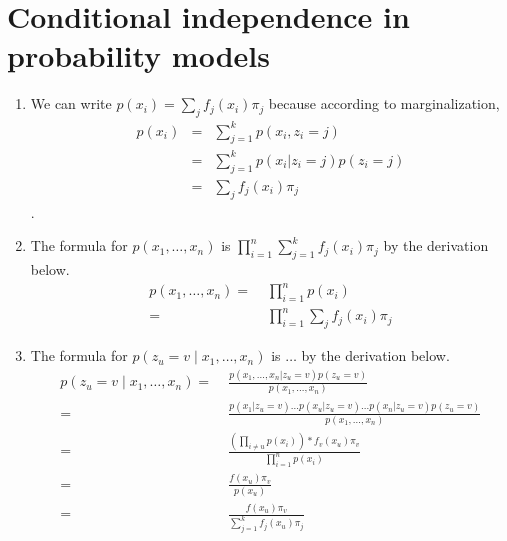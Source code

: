 \section{Conditional independence in probability models}
\begin{enumerate}
\item We can write $p(x_{i})=\sum_{j}f_{j}(x_{i})\pi_{j}$ because according
to marginalization, \begin{eqnarray*}
p(x_{i}) & = & \sum_{j=1}^{k}p(x_{i},z_{i}=j)\\
 & = & \sum_{j=1}^{k}p(x_{i}|z_{i}=j)p(z_{i}=j)\\
 & = & \sum_{j}f_{j}(x_{i})\pi_{j}\end{eqnarray*}
.
\item The formula for $p(x_{1},\dots,x_{n})$ is $\prod_{i=1}^{n}\sum_{j=1}^{k}f_{j}(x_{i})\pi_{j}$
by the derivation below. \begin{align*}
p(x_{1},\dots,x_{n})= & \;\prod_{i=1}^{n}p(x_{i})\\
= & \;\prod_{i=1}^{n}\sum_{j}f_{j}(x_{i})\pi_{j}\end{align*}

\item The formula for $p(z_{u}=v\mid x_{1},\dots,x_{n})$ is $\ldots$ by
the derivation below. \begin{align*}
p(z_{u}=v\mid x_{1},\dots,x_{n})= & \;\frac{p(x_{1},\dots,x_{n}|z_{u}=v)p(z_{u}=v)}{p(x_{1},\dots,x_{n})}\\
= & \;\frac{p(x_{1}|z_{u}=v)...p(x_{u}|z_{u}=v)...p(x_{n}|z_{u}=v)p(z_{u}=v)}{p(x_{1},\dots,x_{n})}\\
= & \;\frac{(\prod_{i\neq u}p(x_{i}))*f_{v}(x_{u})\pi_{v}}{\prod_{i=1}^{n}p(x_{i})}\\
= & \;\frac{f(x_{u})\pi_{v}}{p(x_{u})}\\
= & \;\frac{f(x_{u})\pi_{v}}{\sum_{j=1}^{k}f_{j}(x_{u})\pi_{j}}\end{align*}
 
\end{enumerate}
